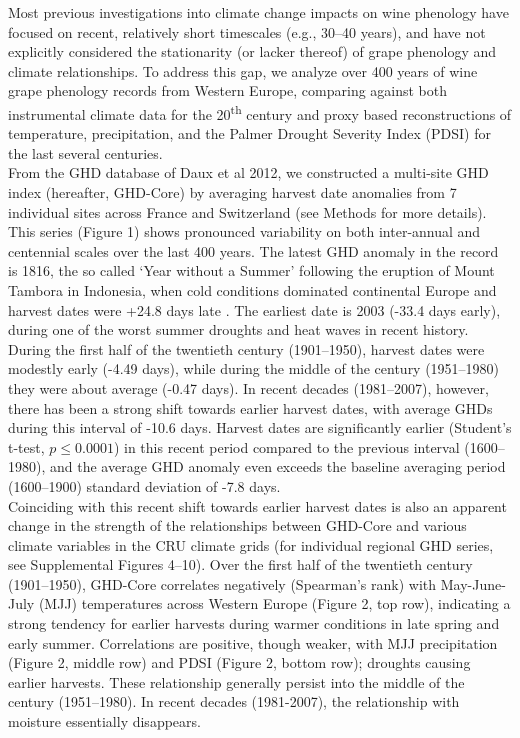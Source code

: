 \documentclass[final]{nature}
\begin{document}
\indent Most previous investigations into climate change impacts on wine phenology have focused on recent, relatively short timescales (e.g., 30--40 years\cite{Duchene:2005bd,tomasi2011,webb2012}), and have not explicitly considered the stationarity (or lacker thereof) of grape phenology and climate relationships. To address this gap, we analyze over 400 years of wine grape phenology records from Western Europe\cite{Daux2012}, comparing against both instrumental climate data for the 20\textsuperscript{th} century and proxy based reconstructions of temperature\cite{Luterbacher2004}, precipitation\cite{Pauling2006}, and the Palmer Drought Severity Index\cite{CookOWDA2015} (PDSI) for the last several centuries.\\
\indent From the GHD database of Daux et al 2012, we constructed a multi-site GHD index (hereafter, GHD-Core) by averaging harvest date anomalies from 7 individual sites across France and Switzerland (see Methods for more details). This series (Figure 1) shows pronounced variability on both inter-annual and centennial scales over the last 400 years. The latest GHD anomaly in the record is 1816, the so called `Year without a Summer' following the eruption of Mount Tambora in Indonesia\cite{Oppenheimer2003}, when cold conditions dominated continental Europe and harvest dates were +24.8 days late . The earliest date is 2003 (-33.4 days early), during one of the worst summer droughts and heat waves in recent history\cite{Rebetz2006}. During the first half of the twentieth century (1901--1950), harvest dates were modestly early (-4.49 days), while during the middle of the century (1951--1980) they were about average (-0.47 days). In recent decades (1981--2007), however, there has been a strong shift towards earlier harvest dates, with average GHDs during this interval of -10.6 days. Harvest dates are significantly earlier (Student's t-test, $p\le0.0001$) in this recent period compared to the previous interval (1600--1980), and the average GHD anomaly even exceeds the baseline averaging period (1600--1900) standard deviation of -7.8 days.\\
\indent Coinciding with this recent shift towards earlier harvest dates is also an apparent change in the strength of the relationships between GHD-Core and various climate variables in the CRU climate grids (for individual regional GHD series, see Supplemental Figures 4--10). Over the first half of the twentieth century (1901--1950), GHD-Core correlates negatively (Spearman's rank) with May-June-July (MJJ) temperatures across Western Europe (Figure 2, top row), indicating a strong tendency for earlier harvests during warmer conditions in late spring and early summer. Correlations are positive, though weaker, with MJJ precipitation (Figure 2, middle row) and PDSI (Figure 2, bottom row); droughts causing earlier harvests. These relationship generally persist into the middle of the century (1951--1980). In recent decades (1981-2007), the relationship with moisture essentially disappears.\\
\end{document}

